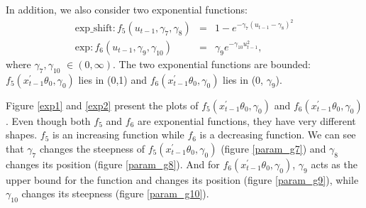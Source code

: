 \documentclass[a4paper,12pt,times,numbered,print,index]{report}
\numberwithin{equation}{section}
\begin{document}
In addition, we also consider two exponential functions:
\begin{eqnarray*}
	\text{exp\_shift}: f_{5}\left( u_{t-1}, \gamma_{7}, \gamma_{8}\right) &=& 1-e^{-\gamma_{7}\left(u_{t-1}-\gamma_{8}\right)^{2}} \\
	\text{exp}: f_{6}\left( u_{t-1},\gamma _{9}, \gamma_{10}\right) &=& \gamma_{9} e^{-\gamma_{10}u_{t-1}^2},
\end{eqnarray*} 
where $\gamma_{7}, \gamma_{10}$ $\in(0, \infty)$. 
The two exponential functions are bounded: $f_{5}\left(x_{t-1}^{\prime }\theta _{0},\gamma_{0}\right)$ lies in (0,1) and $f_{6}\left(x_{t-1}^{\prime }\theta _{0},\gamma _{0}\right)$ lies in (0, $\gamma_{9}$). 

Figure \ref{exp1} and \ref{exp2} present the plots of $f_{5}\left(x_{t-1}^{\prime }\theta _{0},\gamma_{0}\right)$ and $f_{6}\left(x_{t-1}^{\prime }\theta _{0},\gamma_{0}\right)$. Even though both $f_5$ and $f_6$ are exponential functions, they have very different shapes. $f_5$ is an increasing function while $f_6$ is a decreasing function. We can see that $\gamma_{7}$ changes the steepness of $f_{5}\left(x_{t-1}^{\prime }\theta _{0},\gamma_{0}\right)$ (figure \ref{param_g7}) and $\gamma_{8}$ changes its position (figure \ref{param_g8}). And for $f_{6}\left(x_{t-1}^{\prime }\theta _{0},\gamma_{0}\right)$, $\gamma_{9}$ acts as the upper bound for the function and changes its position (figure \ref{param_g9}), while $\gamma_{10}$ changes its steepness (figure \ref{param_g10}).
\end{document}
